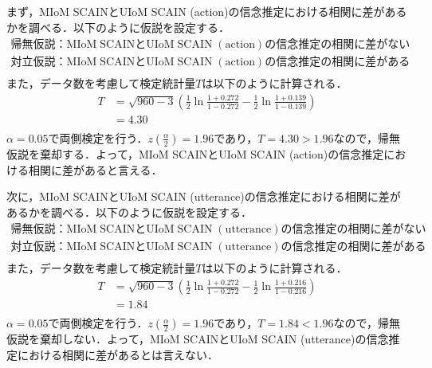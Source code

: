 \par
まず，MIoM SCAINとUIoM SCAIN (action)の信念推定における相関に差があるかを調べる．以下のように仮説を設定する．
\begin{displaymath}
  \begin{split}
  \label{z_a_b_p}
  \mathrm{帰無仮説：MIoM\; SCAINとUIoM\; SCAIN\; (action)の信念推定の相関に差がない}\\
  \mathrm{対立仮説：MIoM\; SCAINとUIoM\; SCAIN\; (action)の信念推定の相関に差がある}\\
  \end{split}
\end{displaymath}
また，データ数を考慮して検定統計量$T$は以下のように計算される．
\begin{displaymath}
  \begin{split}
  \label{z_a_b}
  T&=\sqrt{960-3}\left(\frac{1}{2}\ln{\frac{1+0.272}{1-0.272}-\frac{1}{2}\ln{\frac{1+0.139}{1-0.139}}}\right)\\
  &=4.30\\
  \end{split}
\end{displaymath}
$\alpha=0.05$で両側検定を行う．$z\left(\frac{\alpha}{2}\right)=1.96$であり，$T=4.30>1.96$なので，帰無仮説を棄却する．よって，MIoM SCAINとUIoM SCAIN (action)の信念推定における相関に差があると言える．

\par
次に，MIoM SCAINとUIoM SCAIN (utterance)の信念推定における相関に差があるかを調べる．以下のように仮説を設定する．
\begin{displaymath}
  \begin{split}
    \label{z_a_b}
    \mathrm{帰無仮説：MIoM\; SCAINとUIoM\; SCAIN\; (utterance)の信念推定の相関に差がない}\\
    \mathrm{対立仮説：MIoM\; SCAINとUIoM\; SCAIN\; (utterance)の信念推定の相関に差がある}\\
    \end{split}
\end{displaymath}
また，データ数を考慮して検定統計量$T$は以下のように計算される．
\begin{displaymath}
  \begin{split}
  \label{z_a_b}
  T&=\sqrt{960-3}\left(\frac{1}{2}\ln{\frac{1+0.272}{1-0.272}-\frac{1}{2}\ln{\frac{1+0.216}{1-0.216}}}\right)\\
  &=1.84\\
  \end{split}
\end{displaymath}
$\alpha=0.05$で両側検定を行う．$z\left(\frac{\alpha}{2}\right)=1.96$であり，$T=1.84<1.96$なので，帰無仮説を棄却しない．よって，MIoM SCAINとUIoM SCAIN (utterance)の信念推定における相関に差があるとは言えない．

